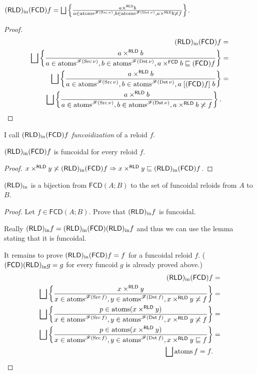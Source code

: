 \begin{prop}
$(\mathsf{RLD})_{\mathrm{in}}(\mathsf{FCD}) f=\bigsqcup\left\{ \frac{a\times^{\mathsf{RLD}}b}{a\in\operatorname{atoms}^{\mathscr{F}(\operatorname{Src}\nu)},b\in\operatorname{atoms}^{\mathscr{F}(\operatorname{Dst}\nu)},a\times^{\mathsf{RLD}}b\not\asymp f}\right\}$.\end{prop}
\begin{proof}
~
\begin{align*}
(\mathsf{RLD})_{\mathrm{in}}(\mathsf{FCD}) f & =\\
\bigsqcup\left\{ \frac{a\times^{\mathsf{RLD}}b}{a\in\operatorname{atoms}^{\mathscr{F}(\operatorname{Src}\nu)},b\in\operatorname{atoms}^{\mathscr{F}(\operatorname{Dst}\nu)},a\times^{\mathsf{FCD}}b\sqsubseteq(\mathsf{FCD}) f}\right\} & =\\
\bigsqcup\left\{ \frac{a\times^{\mathsf{RLD}}b}{a\in\operatorname{atoms}^{\mathscr{F}(\operatorname{Src}\nu)},b\in\operatorname{atoms}^{\mathscr{F}(\operatorname{Dst}\nu)},a\mathrel{\left[(\mathsf{FCD}) f\right]}b}\right\} & =\\
\bigsqcup\left\{ \frac{a\times^{\mathsf{RLD}}b}{a\in\operatorname{atoms}^{\mathscr{F}(\operatorname{Src}\nu)},b\in\operatorname{atoms}^{\mathscr{F}(\operatorname{Dst}\nu)},a\times^{\mathsf{RLD}}b\not\asymp f}\right\}.
\end{align*}
\end{proof}
\begin{defn}
I call $(\mathsf{RLD})_{\mathrm{in}}(\mathsf{FCD}) f$ \emph{funcoidization} of a reloid $f$.\end{defn}
\begin{lem}
$(\mathsf{RLD})_{\mathrm{in}}(\mathsf{FCD}) f$ is funcoidal for every reloid $f$.\end{lem}
\begin{proof}
$x\times^{\mathsf{RLD}}y\not\asymp(\mathsf{RLD})_{\mathrm{in}}(\mathsf{FCD}) f\Rightarrow x\times^{\mathsf{RLD}}y\sqsubseteq(\mathsf{RLD})_{\mathrm{in}}(\mathsf{FCD}) f$.\end{proof}
\begin{thm}
$(\mathsf{RLD})_{\mathrm{in}}$ is a bijection from $\mathsf{FCD}(A;B)$ to the set of
funcoidal reloids from $A$ to $B$.\end{thm}
\begin{proof}
Let $f\in\mathsf{FCD}(A;B)$. Prove that $(\mathsf{RLD})_{\mathrm{in}} f$ is funcoidal.

Really $(\mathsf{RLD})_{\mathrm{in}} f=(\mathsf{RLD})_{\mathrm{in}}(\mathsf{FCD})(\mathsf{RLD})_{\mathrm{in}} f$ and thus we can use
the lemma stating that it is funcoidal.

It remains to prove $(\mathsf{RLD})_{\mathrm{in}}(\mathsf{FCD}) f=f$ for a funcoidal reloid $f$.
($(\mathsf{FCD})(\mathsf{RLD})_{\mathrm{in}} g=g$ for every funcoid $g$ is already proved above.)
\begin{align*}
(\mathsf{RLD})_{\mathrm{in}}(\mathsf{FCD}) f & =\\
\bigsqcup\left\{ \frac{x\times^{\mathsf{RLD}}y}{x\in\operatorname{atoms}^{\mathscr{F}(\operatorname{Src} f)},y\in\operatorname{atoms}^{\mathscr{F}(\operatorname{Dst} f)},x\times^{\mathsf{RLD}}y\not\asymp f}\right\} & =\\
\bigsqcup\left\{ \frac{p\in\operatorname{atoms}(x\times^{\mathsf{RLD}}y)}{x\in\operatorname{atoms}^{\mathscr{F}(\operatorname{Src} f)},y\in\operatorname{atoms}^{\mathscr{F}(\operatorname{Dst} f)},x\times^{\mathsf{RLD}}y\not\asymp f}\right\} & =\\
\bigsqcup\left\{ \frac{p\in\operatorname{atoms}(x\times^{\mathsf{RLD}}y)}{x\in\operatorname{atoms}^{\mathscr{F}(\operatorname{Src} f)},y\in\operatorname{atoms}^{\mathscr{F}(\operatorname{Dst} f)},x\times^{\mathsf{RLD}}y\sqsubseteq f}\right\} & =\\
\bigsqcup\operatorname{atoms} f=f.
\end{align*}
\end{proof}
